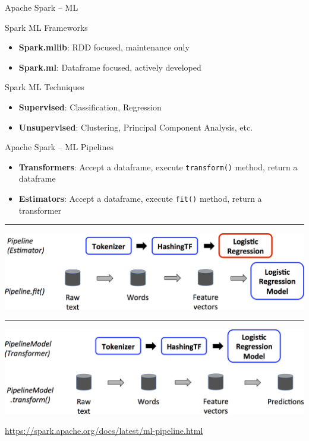 \documentclass[ignorenonframetext,xcolor=x11names]{beamer}
\begin{document}
\begin{frame}{Apache Spark -- ML}
\begin{block}{Spark ML Frameworks}
\begin{itemize}
   \item \textbf{Spark.mllib}: RDD focused, maintenance only
   \item \textbf{Spark.ml}: Dataframe focused, actively developed
\end{itemize}
\end{block}
\begin{block}{Spark ML Techniques}
\begin{itemize}
   \item \textbf{Supervised}: Classification, Regression
   \item \textbf{Unsupervised}: Clustering, Principal Component Analysis, etc.
\end{itemize}
\end{block}
\end{frame}

\begin{frame}{Apache Spark -- ML Pipelines}
\begin{itemize}
   \item \textbf{Transformers}: Accept a dataframe, execute \texttt{transform()} method, return a dataframe
   \item \textbf{Estimators}: Accept a dataframe, execute \texttt{fit()} method, return a transformer
\end{itemize}
\vspace{.5\baselineskip}
\hrule
\vspace{.5\baselineskip}
\centering
\includegraphics[width=.75\textwidth]{ml-Pipeline1.png} 

\vspace{.5\baselineskip}

\hrule

\vspace{.5\baselineskip}

\includegraphics[width=.75\textwidth]{ml-Pipeline2.png} 

\scriptsize \url{https://spark.apache.org/docs/latest/ml-pipeline.html} \normalsize
\end{frame}
\end{document}
